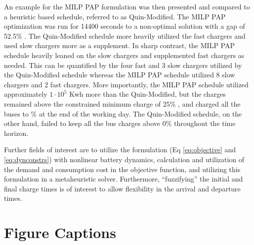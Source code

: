 \documentclass[utf8]{FrontiersinHarvard}
\newcommand{\bcharge}{0.7 }                                                     %
\newcommand{\mincharge}{25\% }                                                  %
\newcommand{\timeran}{14400 }                                                   %
\newcommand{\gappercent}{52.5\% }                                               %
\begin{document}
An example for the MILP PAP formulation was then presented and compared to a heuristic based schedule, referred to as
Quin-Modified. The MILP PAP optimization was run for \timeran seconds to a non-optimal solution with a gap of
\gappercent. The Quin-Modified schedule more heavily utilized the fast chargers and used slow chargers more as a
supplement. In sharp contrast, the MILP PAP schedule heavily leaned on the slow chargers and supplemented fast chargers
as needed. This can be quantified by the four fast and 3 slow chargers utilized by the Quin-Modified schedule whereas
the MILP PAP schedule utilized 8 slow chargers and 2 fast chargers. More importantly, the MILP PAP schedule utilized
approximately $1\cdot10^5$ Kwh more than the Quin-Modified, but the charges remained above the constrained minimum charge of
\mincharge, and charged all the buses to \fpeval{\bcharge *100}\% at the end of the working day. The Quin-Modified
schedule, on the other hand, failed to keep all the bus charges above 0\% throughout the time horizon.

Further fields of interest are to utilize the formulation (Eq \eqref{eq:objective} and \eqref{eq:dynconstrs}) with
nonlinear battery dynamics, calculation and utilization of the demand and consumption cost in the objective function,
and utilizing this formulation in a metaheuristic solver. Furthermore, ``fuzzifying'' the initial and final charge times
is of interest to allow flexibility in the arrival and departure times.

%




\newpage
\section*{Figure Captions}






\end{document}
